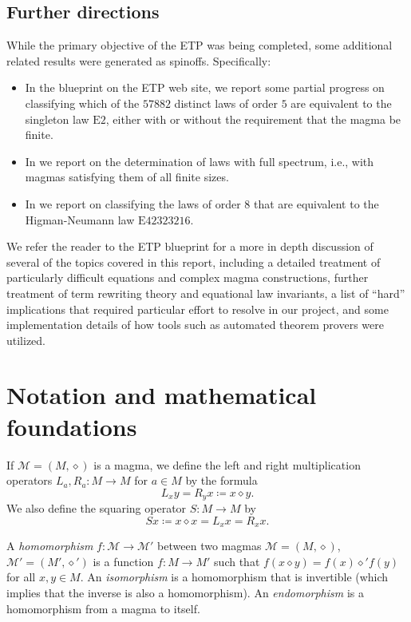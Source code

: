 \documentclass[12pt]{amsart}
\theoremstyle{definition}
\newcommand{\op}{\diamond}
\newcommand{\Magma}{{\mathcal{M}}}
\newcommand{\Eq}[1]{\mathrm{E}#1}
\begin{document}
\subsection{Further directions}

While the primary objective of the ETP was being completed, some additional related results were generated as spinoffs.  Specifically:
\begin{itemize}
\item In the blueprint on the ETP web site, we report some partial progress on classifying which of the $\num{57882}$ distinct laws of order $5$ are equivalent to the singleton law $\Eq{2}$, either with or without the requirement that the magma be finite.
\item In  we report on the determination of laws with full spectrum, i.e., with magmas satisfying them of all finite sizes.
\item In  we report on classifying the laws of order $8$ that are equivalent to the Higman-Neumann law $\Eq{42323216}$.
\end{itemize}

We refer the reader to the ETP blueprint for a more in depth discussion of several of the topics covered in this report, including a detailed treatment of particularly difficult equations and complex magma constructions, further treatment of term rewriting theory and equational law invariants, a list of ``hard'' implications that required particular effort to resolve in our project, and some implementation details of how tools such as automated theorem provers were utilized.

\section{Notation and mathematical foundations}\label{notation-sec}

If $\Magma = (M,\op)$ is a magma, we define the left and right multiplication operators $L_a, R_a \colon M \to M$ for $a \in M$ by the formula
\begin{equation}\label{left-right}
    L_x y = R_y x \coloneqq x \op y.
\end{equation}
We also define the squaring operator $S \colon M \to M$ by
\begin{equation}\label{square-def}
    Sx \coloneqq x \op x = L_x x = R_x x.
\end{equation}

A \emph{homomorphism} $f \colon \Magma \to \Magma'$ between two magmas $\Magma = (M,\op)$, $\Magma' = (M',\op')$ is a function $f \colon M \to M'$ such that $f(x \op y) = f(x) \op' f(y)$ for all $x,y \in M$.  An \emph{isomorphism} is a homomorphism that is invertible (which implies that the inverse is also a homomorphism).  An \emph{endomorphism} is a homomorphism from a magma to itself.
\end{document}
